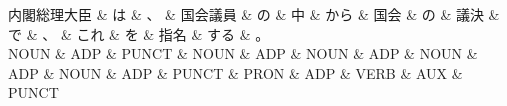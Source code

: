 \documentclass[tikz,border=5pt]{standalone}
\begin{document}
\normalsize
\begin{dependency}[edge unit distance=12.0pt]
    \begin{deptext}[column sep=1em]
        内閣総理大臣 \& は \& 、 \& 国会議員 \& の \& 中 \& から \& 国会 \& の \& 議決 \& で \& 、 \& これ \& を \& 指名 \& する \& 。\\
        NOUN \& ADP \& PUNCT \& NOUN \& ADP \& NOUN \& ADP \& NOUN \& ADP \& NOUN \& ADP \& PUNCT \& PRON \& ADP \& VERB \& AUX \& PUNCT\\
    \end{deptext}
\end{dependency}
\end{document}
